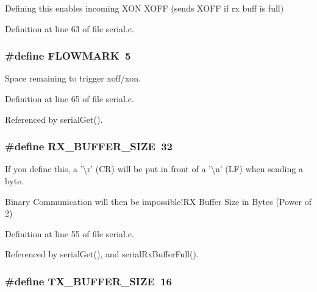 Defining this enables incoming X\-O\-N X\-O\-F\-F (sends X\-O\-F\-F if rx buff is full) 



Definition at line 63 of file serial.\-c.

\hypertarget{group__uart_gaa7907a070ef8e6d68d7d774b34eebe66}{
\subsubsection[{F\-L\-O\-W\-M\-A\-R\-K}]{\setlength{\rightskip}{0pt plus 5cm}\#define F\-L\-O\-W\-M\-A\-R\-K~5}}\label{group__uart_gaa7907a070ef8e6d68d7d774b34eebe66}


Space remaining to trigger xoff/xon. 



Definition at line 65 of file serial.\-c.



Referenced by serial\-Get().

\hypertarget{group__uart_ga739a2a1a0047c98ac1b18ecd25dac092}{
\subsubsection[{R\-X\-\_\-\-B\-U\-F\-F\-E\-R\-\_\-\-S\-I\-Z\-E}]{\setlength{\rightskip}{0pt plus 5cm}\#define R\-X\-\_\-\-B\-U\-F\-F\-E\-R\-\_\-\-S\-I\-Z\-E~32}}\label{group__uart_ga739a2a1a0047c98ac1b18ecd25dac092}


If you define this, a '\textbackslash{}r' (C\-R) will be put in front of a '\textbackslash{}n' (L\-F) when sending a byte. 

Binary Communication will then be impossible!\-R\-X Buffer Size in Bytes (Power of 2) 

Definition at line 55 of file serial.\-c.



Referenced by serial\-Get(), and serial\-Rx\-Buffer\-Full().

\hypertarget{group__uart_ga9ab33647617098646990fe263600b650}{
\subsubsection[{T\-X\-\_\-\-B\-U\-F\-F\-E\-R\-\_\-\-S\-I\-Z\-E}]{\setlength{\rightskip}{0pt plus 5cm}\#define T\-X\-\_\-\-B\-U\-F\-F\-E\-R\-\_\-\-S\-I\-Z\-E~16}}\label{group__uart_ga9ab33647617098646990fe263600b650}


